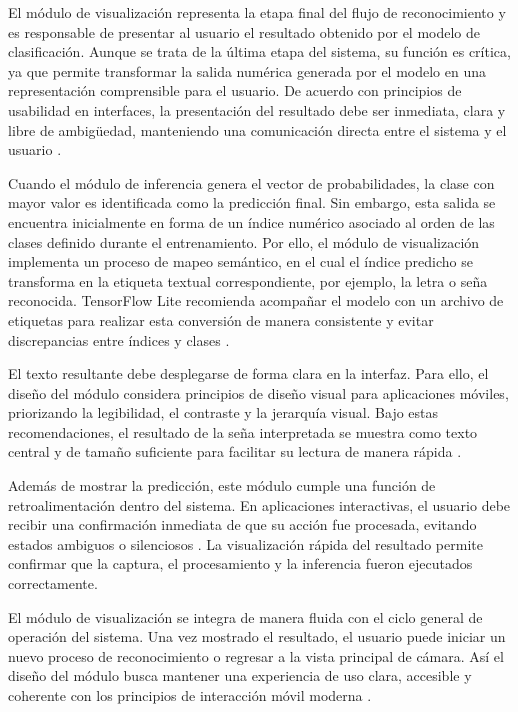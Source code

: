 	El módulo de visualización representa la etapa final del flujo de reconocimiento y es responsable de presentar al usuario el resultado obtenido por el modelo de clasificación. Aunque se trata de la última etapa del sistema, su función es crítica, ya que permite transformar la salida numérica generada por el modelo en una representación comprensible para el usuario. De acuerdo con principios de usabilidad en interfaces, la presentación del resultado debe ser inmediata, clara y libre de ambigüedad, manteniendo una comunicación directa entre el sistema y el usuario \cite{nng_heuristics}.
	
	Cuando el módulo de inferencia genera el vector de probabilidades, la clase con mayor valor es identificada como la predicción final. Sin embargo, esta salida se encuentra inicialmente en forma de un índice numérico asociado al orden de las clases definido durante el entrenamiento. Por ello, el módulo de visualización implementa un proceso de mapeo semántico, en el cual el índice predicho se transforma en la etiqueta textual correspondiente, por ejemplo, la letra o seña reconocida. TensorFlow Lite recomienda acompañar el modelo con un archivo de etiquetas para realizar esta conversión de manera consistente y evitar discrepancias entre índices y clases \cite{tflite}.
	
	El texto resultante debe desplegarse de forma clara en la interfaz. Para ello, el diseño del módulo considera principios de diseño visual para aplicaciones móviles, priorizando la legibilidad, el contraste y la jerarquía visual. Bajo estas recomendaciones, el resultado de la seña interpretada se muestra como texto central y de tamaño suficiente para facilitar su lectura de manera rápida \cite{material_design}.
	
	Además de mostrar la predicción, este módulo cumple una función de retroalimentación dentro del sistema. En aplicaciones interactivas, el usuario debe recibir una confirmación inmediata de que su acción fue procesada, evitando estados ambiguos o silenciosos \cite{nng_heuristics}. La visualización rápida del resultado permite confirmar que la captura, el procesamiento y la inferencia fueron ejecutados correctamente.
	
	El módulo de visualización se integra de manera fluida con el ciclo general de operación del sistema. Una vez mostrado el resultado, el usuario puede iniciar un nuevo proceso de reconocimiento o regresar a la vista principal de cámara. Así el diseño del módulo busca mantener una experiencia de uso clara, accesible y coherente con los principios de interacción móvil moderna \cite{material_design}.
	
